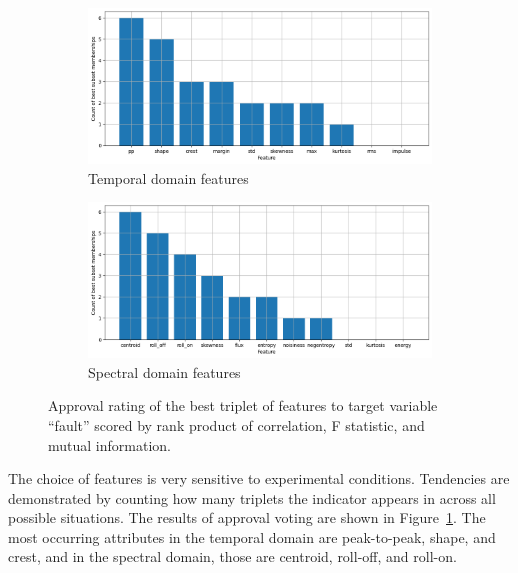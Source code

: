 \begin{figure}[h!]
    \centering
    \begin{subfigure}[b]{0.49\textwidth}
        \includegraphics[width=\textwidth]{assets/design/approval-voting-temporal.png}
        \caption{Temporal domain features}
    \end{subfigure}
    \hfill
    \begin{subfigure}[b]{0.49\textwidth}
        \includegraphics[width=\textwidth]{assets/design/approval-voting-spectral.png}
        \caption{Spectral domain features}
    \end{subfigure}
    \caption{Approval rating of the best triplet of features to target variable ``fault'' scored by rank product of correlation, F statistic, and mutual information.}
    \label{fig:design:approval-rating-features}
\end{figure}

The choice of features is very sensitive to experimental conditions. Tendencies are demonstrated by counting how many triplets the indicator appears in across all possible situations. The results of approval voting are shown in Figure~\ref{fig:design:approval-rating-features}. The most occurring attributes in the temporal domain are peak-to-peak, shape, and crest, and in the spectral domain, those are centroid, roll-off, and roll-on.


